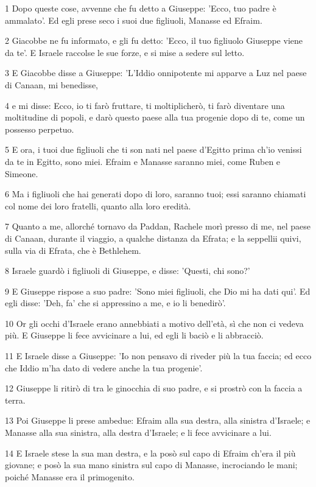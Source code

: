 \par 1 Dopo queste cose, avvenne che fu detto a Giuseppe: 'Ecco, tuo padre è ammalato'. Ed egli prese seco i suoi due figliuoli, Manasse ed Efraim.
\par 2 Giacobbe ne fu informato, e gli fu detto: 'Ecco, il tuo figliuolo Giuseppe viene da te'. E Israele raccolse le sue forze, e si mise a sedere sul letto.
\par 3 E Giacobbe disse a Giuseppe: 'L'Iddio onnipotente mi apparve a Luz nel paese di Canaan, mi benedisse,
\par 4 e mi disse: Ecco, io ti farò fruttare, ti moltiplicherò, ti farò diventare una moltitudine di popoli, e darò questo paese alla tua progenie dopo di te, come un possesso perpetuo.
\par 5 E ora, i tuoi due figliuoli che ti son nati nel paese d'Egitto prima ch'io venissi da te in Egitto, sono miei. Efraim e Manasse saranno miei, come Ruben e Simeone.
\par 6 Ma i figliuoli che hai generati dopo di loro, saranno tuoi; essi saranno chiamati col nome dei loro fratelli, quanto alla loro eredità.
\par 7 Quanto a me, allorché tornavo da Paddan, Rachele morì presso di me, nel paese di Canaan, durante il viaggio, a qualche distanza da Efrata; e la seppellii quivi, sulla via di Efrata, che è Bethlehem.
\par 8 Israele guardò i figliuoli di Giuseppe, e disse: 'Questi, chi sono?'
\par 9 E Giuseppe rispose a suo padre: 'Sono miei figliuoli, che Dio mi ha dati qui'. Ed egli disse: 'Deh, fa' che si appressino a me, e io li benedirò'.
\par 10 Or gli occhi d'Israele erano annebbiati a motivo dell'età, sì che non ci vedeva più. E Giuseppe li fece avvicinare a lui, ed egli li baciò e li abbracciò.
\par 11 E Israele disse a Giuseppe: 'Io non pensavo di riveder più la tua faccia; ed ecco che Iddio m'ha dato di vedere anche la tua progenie'.
\par 12 Giuseppe li ritirò di tra le ginocchia di suo padre, e si prostrò con la faccia a terra.
\par 13 Poi Giuseppe li prese ambedue: Efraim alla sua destra, alla sinistra d'Israele; e Manasse alla sua sinistra, alla destra d'Israele; e li fece avvicinare a lui.
\par 14 E Israele stese la sua man destra, e la posò sul capo di Efraim ch'era il più giovane; e posò la sua mano sinistra sul capo di Manasse, incrociando le mani; poiché Manasse era il primogenito.
